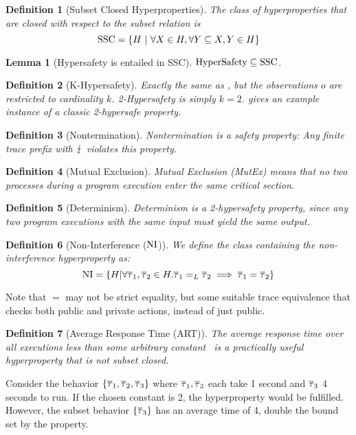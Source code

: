 \documentclass[a4paper,names,dvipsnames]{article}
\newtheorem{definition}{Definition}
\newtheorem{lemma}{Lemma}
\begin{document}
\begin{definition}[Subset Closed Hyperproperties]
  The class of hyperproperties that are closed with respect to the subset relation is
  $$
  \cSS = \left\{H\ |\ \forall X\in H, \forall Y\subseteq X, Y \in H\right\}
  $$
\end{definition}

\begin{lemma}[Hypersafety is entailed in SSC]
  $\text{HyperSafety}\subseteq\text{SSC}$.
\end{lemma}

\begin{definition}[K-Hypersafety]
  Exactly the same as , but the observations $o$ are restricted to cardinality $k$.
  2-Hypersafety is simply $k=2$.  gives an example instance of a classic 2-hypersafe property.
\end{definition}

\begin{definition}[Nontermination]
  Nontermination is a safety property: Any finite trace prefix with $\lightning$ violates this property.
\end{definition}

\begin{definition}[Mutual Exclusion]
  Mutual Exclusion (MutEx) means that no two processes during a program execution enter the same critical section.
\end{definition}

\begin{definition}[Determinism]
  Determinism is a 2-hypersafety property, since any two program executions with the same input must yield the same output.
\end{definition}

\begin{definition}[Non-Interference ($\text{NI}$)]\label{def:ni}
  We define the class containing the non-interference hyperproperty as:
  $$
  \text{NI} = \left\{ H | \forall \overline{\tau}_{1},\overline{\tau}_{2}\in H. {\overline{\tau}_{1}}=_L{\overline{\tau}_{2}}\implies\overline{\tau}_{1}=\overline{\tau}_{2} \right\}
  $$
\end{definition}
Note that $=$ may not be strict equality, but some suitable trace equivalence that checks both public and private actions, instead of just public.

\begin{definition}[Average Response Time (ART)]
  The average response time over all executions less than some arbitrary constant~\cite{clarkson08} is a practically useful hyperproperty that is not subset closed.
\end{definition}
Consider the behavior $\{\overline{\tau}_{1},\overline{\tau}_{2},\overline{\tau}_{3}\}$ where $\overline{\tau}_{1},\overline{\tau}_{2}$ each take 1 second and $\overline{\tau}_{3}$ 4 seconds to run.
If the chosen constant is 2, the hyperproperty would be fulfilled. However, the subset behavior $\{\overline{\tau}_{3}\}$ has an average time of 4, double the bound set by the property.
\end{document}
